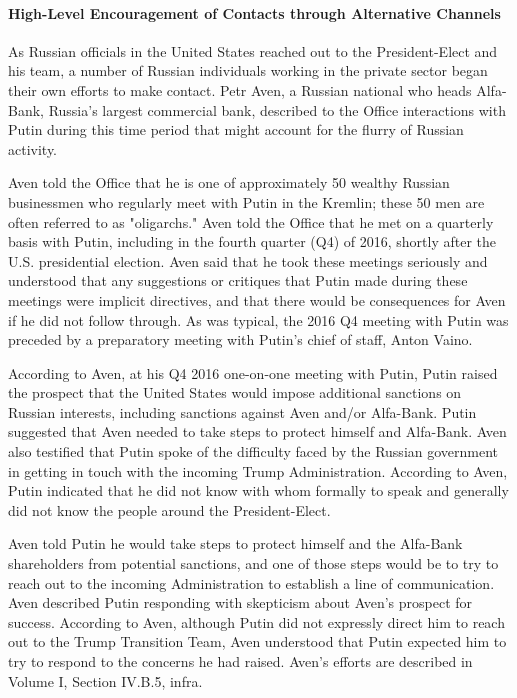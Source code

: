 \paragraph{High-Level Encouragement of Contacts through Alternative Channels}

As Russian officials in the United States reached out to the President-Elect and his team, a number of Russian individuals working in the private sector began their own efforts to make contact.
Petr Aven, a Russian national who heads Alfa-Bank, Russia's largest commercial bank, described to the Office interactions with Putin during this time period that might account for the flurry of Russian activity.%

Aven told the Office that he is one of approximately 50 wealthy Russian businessmen who regularly meet with Putin in the Kremlin; these 50 men are often referred to as "oligarchs."%
Aven told the Office that he met on a quarterly basis with Putin, including in the fourth quarter (Q4) of 2016, shortly after the U.S. presidential election.%
Aven said that he took these meetings seriously and understood that any suggestions or critiques that Putin made during these meetings were implicit directives, and that there would be consequences for Aven if he did not follow through.%
As was typical, the 2016 Q4 meeting with Putin was preceded by a preparatory meeting with Putin's chief of staff, Anton Vaino.%

According to Aven, at his Q4 2016 one-on-one meeting with Putin,%
Putin raised the prospect that the United States would impose additional sanctions on Russian interests, including sanctions against Aven and/or Alfa-Bank.%
Putin suggested that Aven needed to take steps to protect himself and Alfa-Bank.%
Aven also testified that Putin spoke of the difficulty faced by the Russian government in getting in touch with the incoming Trump Administration.%
According to Aven, Putin indicated that he did not know with whom formally to speak and generally did not know the people around the President-Elect.%

Aven
told Putin he would take steps to protect himself and the Alfa-Bank shareholders from potential sanctions, and one of those steps would be to try to reach out to the incoming Administration to establish a line of communication.%
Aven described Putin responding with skepticism about Aven's prospect for success.%
According to Aven, although Putin did not expressly direct him to reach out to the Trump Transition Team, Aven understood that Putin expected him to try to respond to the concerns he had raised.%
Aven's efforts are described in Volume I, Section IV.B.5, infra.

